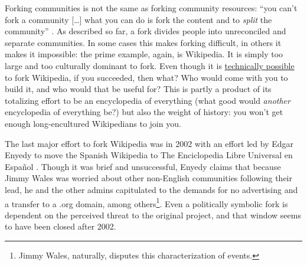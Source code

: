 \documentclass[10pt]{article}
\begin{document}
\begin{multicols}{2}
Forking communities is not the same as forking community resources:
``you can't fork a community {[}\ldots{]} what you can do is fork the
content and to \emph{split} the community'' \cite{MeatballWikiForkingOfOnlineCommunitiesa} . As described so far, a
fork divides people into unreconciled and separate communities. In some
cases this makes forking difficult, in others it makes it impossible:
the prime example, again, is Wikipedia. It is simply too large and too
culturally dominant to fork. Even though it is
\href{https://en.wikipedia.org/wiki/Wikipedia:FAQ/Forking\#Am_I_allowed_to_fork_Wikipedia?}{technically
possible} to fork Wikipedia, if you succeeded, then what? Who would come
with you to build it, and who would that be useful for? This is partly a
product of its totalizing effort to be an encyclopedia of everything
(what good would \emph{another} encyclopedia of everything be?) but also
the weight of history: you won't get enough long-encultured Wikipedians
to join you.

The last major effort to fork Wikipedia was in 2002 with an effort led
by Edgar Enyedy to move the Spanish Wikipedia to The Enciclopedia Libre
Universal en Español \cite{tkaczSpanishForkWikipedia2011, tkaczWikipediaPoliticsOpenness2014} . Though it was brief and
unsuccessful, Enyedy claims that because Jimmy Wales was worried about
other non-English communities following their lead, he and the other
admins capitulated to the demands for no advertising and a transfer to a
.org domain, among others\footnote{Jimmy Wales, naturally, disputes this
  characterization of events.}. Even a politically symbolic fork is
dependent on the perceived threat to the original project, and that
window seems to have been closed after 2002.


\end{multicols}
\end{document}
